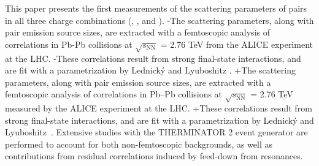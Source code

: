  This paper presents the first measurements of the scattering parameters of \LamK pairs in all three charge combinations (\LamKchP, \LamKchM, and \LamKs).
-The scattering parameters, along with pair emission source sizes, are extracted with a femtoscopic analysis of \LamK correlations in Pb-Pb collisions at $\sqrt{s_{\mathrm{NN}}}$ = 2.76 TeV from the ALICE experiment at the LHC.  
-These correlations result from strong final-state interactions, and are fit with a parametrization by Lednick\'y and Lyuboshitz \cite{Lednicky:82}.  
+The scattering parameters, along with pair emission source sizes, are extracted with a femtoscopic analysis of \LamK correlations in Pb--Pb collisions at $\sqrt{s_{\mathrm{NN}}}$ = 2.76 TeV measured by the ALICE experiment at the LHC.  
+These correlations result from strong final-state interactions, and are fit with a parametrization by Lednick\'y and Lyuboshitz~\cite{Lednicky:82}.  
 Extensive studies with the THERMINATOR 2 event generator are performed to account for both non-femtoscopic backgrounds, as well as contributions from residual correlations induced by feed-down from resonances.
 
